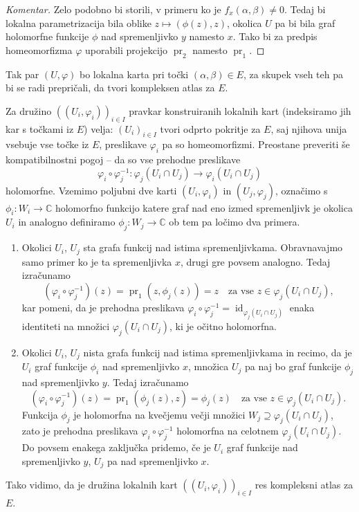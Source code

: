 \documentclass[mat1]{fmfdelo}
\newcommand{\C}{\mathbb C}
\newcommand{\inv}{^{-1}}
\DeclareMathOperator{\id}{id}
\DeclareMathOperator{\pr}{pr}
\theoremstyle{definition}
\newenvironment{komentar}[1][Komentar]{\begin{proof}[#1]\let\qed\relax}{\end{proof}}
\begin{document}



\begin{komentar}
    Zelo podobno bi storili, v primeru ko je $f_x(\alpha, \beta) \neq 0$. Tedaj bi lokalna parametrizacija bila oblike $z \mapsto (\phi(z), z)$, okolica $U$ pa bi bila graf holomorfne funkcije $\phi$ nad spremenljivko $y$ namesto $x$. Tako bi za predpis homeomorfizma $\varphi$ uporabili projekcijo $\pr_2$ namesto $\pr_1$.
\end{komentar}

Tak par $(U, \varphi)$ bo lokalna karta pri točki $(\alpha, \beta) \in E$, za skupek vseh teh pa bi se radi prepričali, da tvori kompleksen atlas za $E$. 

Za družino $((U_i, \varphi_i))_{i \in I}$ pravkar konstruiranih lokalnih kart (indeksiramo jih kar s točkami iz $E$) velja: $(U_i)_{i \in I}$ tvori odprto pokritje za $E$, saj njihova unija vsebuje vse točke iz $E$, preslikave $\varphi_i$ pa so homeomorfizmi. Preostane preveriti še kompatibilnostni pogoj -- da so vse prehodne preslikave
\[
    \varphi_i \circ \varphi_j\inv : \varphi_j(U_i \cap U_j) \to \varphi_i(U_i \cap U_j)  
\]
holomorfne. Vzemimo poljubni dve karti $(U_i, \varphi_i)$ in $(U_j, \varphi_j)$, označimo s $\phi_i : W_i \to \C$ holomorfno funkcijo katere graf nad eno izmed spremenljivk je okolica $U_i$ in analogno definiramo $\phi_j : W_j \to \C$ ob tem pa ločimo dva primera. 
\begin{enumerate}
    \item Okolici $U_i$, $U_j$ sta grafa funkcij nad istima spremenljivkama. Obravnavajmo samo primer ko je ta spremenljivka $x$, drugi gre povsem analogno. Tedaj izračunamo
    \[
        (\varphi_i \circ \varphi_j\inv)(z) = \pr_1(z, \phi_j(z)) = z \quad \text{za vse $z \in \varphi_j(U_i \cap U_j)$,}
    \] 
    kar pomeni, da je prehodna preslikava $\varphi_i \circ \varphi_j\inv = \id_{\varphi_j(U_i \cap U_j)}$ enaka identiteti na množici $\varphi_j(U_i \cap U_j)$, ki je očitno holomorfna. 

    \item Okolici $U_i$, $U_j$ nista grafa funkcij nad istima spremenljivkama in recimo, da je $U_i$ graf funkcije $\phi_i$ nad spremenljivko $x$, množica $U_j$ pa naj bo graf funkcije $\phi_j$ nad spremenljivko $y$. Tedaj izračunamo
    \[
        (\varphi_i \circ \varphi_j\inv)(z) = \pr_1(\phi_j(z), z) = \phi_j(z) \quad \text{za vse $z \in \varphi_j(U_i \cap U_j)$.}   
    \]
    Funkcija $\phi_j$ je holomorfna na kvečjemu večji množici $W_j \supseteq \varphi_j(U_i \cap U_j)$, zato je prehodna preslikava $\varphi_i \circ \varphi_j\inv$ holomorfna na celotnem $\varphi_j(U_i \cap U_j)$. Do povsem enakega zaključka pridemo, če je $U_i$ graf funkcije nad spremenljivko $y$, $U_j$ pa nad spremenljivko $x$. 
\end{enumerate} 
Tako vidimo, da je družina lokalnih kart $((U_i, \varphi_i))_{i \in I}$ res kompleksni atlas za $E$. 
\end{document}
